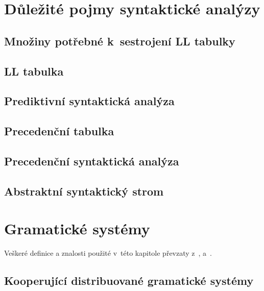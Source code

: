 \chapter{Důležité pojmy syntaktické analýzy }\label{5_teorie_sa}




\section{Množiny potřebné k~sestrojení LL tabulky}

\section{LL tabulka}





\section{Prediktivní syntaktická analýza}

\section{Precedenční tabulka}

\section{Precedenční syntaktická analýza}

\section{Abstraktní syntaktický strom}


\chapter{Gramatické systémy}\label{kap_GS}

Veškeré definice a znalosti použité v~této kapitole převzaty z~\cite{CDGS}, \cite{PCGS} a~\cite{Handbook-Of-Formal-Languages-2}.

\section{Kooperující distribuované gramatické systémy}\label{kap_CDGS}

